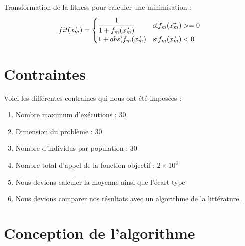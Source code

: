 \documentclass[a4paper, fontsize=11pt]{article}
\begin{document}
Transformation de la fitness pour calculer une minimisation :
\begin{equation}
fit(\vec{x_m}) = \begin{cases}
	\cfrac{1}{1 + f_m(\vec{x_m})} & \text{si} f_m(\vec{x_m}) >= 0\\
	1 + abs(f_m(\vec{x_m}) & \text{si} f_m(\vec{x_m}) < 0
	\end{cases}
\end{equation}

\newpage

\section{Contraintes}
Voici les différentes contraines qui nous ont été imposées :

\begin{enumerate}
\item Nombre maximum d'exécutions : 30

\item Dimension du problème : 30

\item Nombre d'individus par population : 30

\item Nombre total d'appel de la fonction objectif : $2 \times 10 ^ 3$

\item Nous devions calculer la moyenne ainsi que l'écart type

\item Nous devions comparer nos résultats avec un algorithme de la littérature.
\end{enumerate}

\newpage

\section{Conception de l'algorithme}
\end{document}
